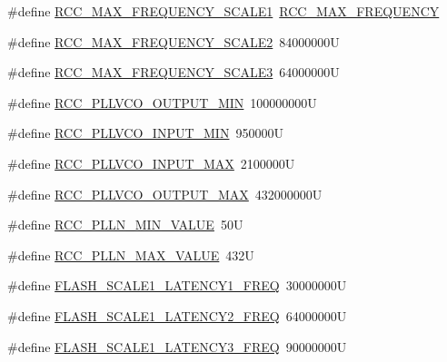 \begin{DoxyCompactItemize}
\item 
\#define \hyperlink{group___exported__macros_ga152c4bb0b78589a06d72e0170dd3b304}{R\+C\+C\+\_\+\+M\+A\+X\+\_\+\+F\+R\+E\+Q\+U\+E\+N\+C\+Y\+\_\+\+S\+C\+A\+L\+E1}~\hyperlink{group___exported__macros_ga08aeea283003a2c787227347087b5b1f}{R\+C\+C\+\_\+\+M\+A\+X\+\_\+\+F\+R\+E\+Q\+U\+E\+N\+CY}
\item 
\#define \hyperlink{group___exported__macros_gafcb2c5211d9cbed86b111c83a0ce427b}{R\+C\+C\+\_\+\+M\+A\+X\+\_\+\+F\+R\+E\+Q\+U\+E\+N\+C\+Y\+\_\+\+S\+C\+A\+L\+E2}~84000000U
\item 
\#define \hyperlink{group___exported__macros_ga60fbed15643b623aa4541b9d8828d0f1}{R\+C\+C\+\_\+\+M\+A\+X\+\_\+\+F\+R\+E\+Q\+U\+E\+N\+C\+Y\+\_\+\+S\+C\+A\+L\+E3}~64000000U
\item 
\#define \hyperlink{group___exported__macros_ga85746dffdc6d015f5142d7e16489ca84}{R\+C\+C\+\_\+\+P\+L\+L\+V\+C\+O\+\_\+\+O\+U\+T\+P\+U\+T\+\_\+\+M\+IN}~100000000U
\item 
\#define \hyperlink{group___exported__macros_ga288d68c2604cea8548eccdef3873923f}{R\+C\+C\+\_\+\+P\+L\+L\+V\+C\+O\+\_\+\+I\+N\+P\+U\+T\+\_\+\+M\+IN}~950000U
\item 
\#define \hyperlink{group___exported__macros_gad3fd37dbfa74739a3c698ab4755fa27e}{R\+C\+C\+\_\+\+P\+L\+L\+V\+C\+O\+\_\+\+I\+N\+P\+U\+T\+\_\+\+M\+AX}~2100000U
\item 
\#define \hyperlink{group___exported__macros_gaba6ddae0375763847f8dc3e91173d714}{R\+C\+C\+\_\+\+P\+L\+L\+V\+C\+O\+\_\+\+O\+U\+T\+P\+U\+T\+\_\+\+M\+AX}~432000000U
\item 
\#define \hyperlink{group___exported__macros_ga6015e60e123ddde47bb3ddfab170c5a1}{R\+C\+C\+\_\+\+P\+L\+L\+N\+\_\+\+M\+I\+N\+\_\+\+V\+A\+L\+UE}~50U
\item 
\#define \hyperlink{group___exported__macros_ga9d6c2fd92a420bb80caf8ca2cadb6a62}{R\+C\+C\+\_\+\+P\+L\+L\+N\+\_\+\+M\+A\+X\+\_\+\+V\+A\+L\+UE}~432U
\item 
\#define \hyperlink{group___exported__macros_ga980965268c210a75ca5bb1e6b59b4052}{F\+L\+A\+S\+H\+\_\+\+S\+C\+A\+L\+E1\+\_\+\+L\+A\+T\+E\+N\+C\+Y1\+\_\+\+F\+R\+EQ}~30000000U
\item 
\#define \hyperlink{group___exported__macros_ga53673600707f291baa71c30919f8da98}{F\+L\+A\+S\+H\+\_\+\+S\+C\+A\+L\+E1\+\_\+\+L\+A\+T\+E\+N\+C\+Y2\+\_\+\+F\+R\+EQ}~64000000U
\item 
\#define \hyperlink{group___exported__macros_ga547cb8d59cf6a2a73a0f76331e4492df}{F\+L\+A\+S\+H\+\_\+\+S\+C\+A\+L\+E1\+\_\+\+L\+A\+T\+E\+N\+C\+Y3\+\_\+\+F\+R\+EQ}~90000000U

\end{DoxyCompactItemize}
